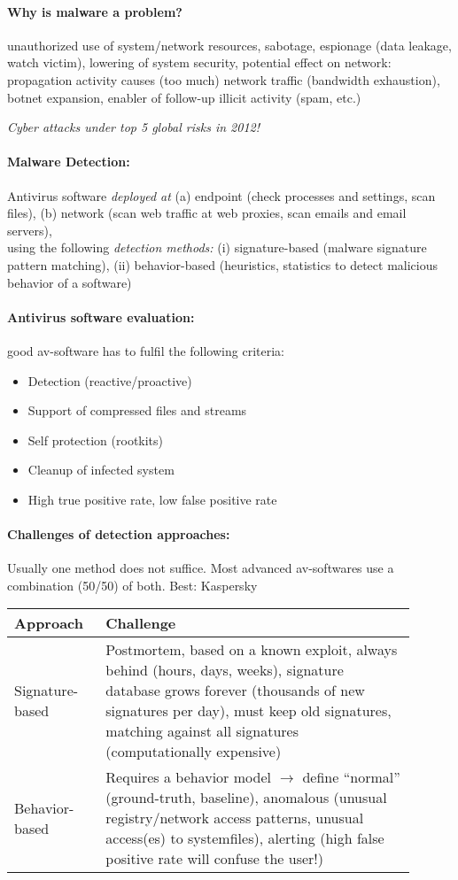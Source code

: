 \paragraph{Why is malware a problem?} unauthorized use of system/network resources,
sabotage, espionage (data leakage, watch victim),
lowering of system security, potential effect on
network: propagation activity causes (too much) network traffic (bandwidth exhaustion), botnet expansion, enabler of follow-up illicit activity (spam, etc.)

\emph{Cyber attacks under top 5 global risks in 2012!}

\paragraph{Malware Detection:} Antivirus software \emph{deployed at} (a) endpoint (check processes and settings, scan files), (b) network (scan web traffic at web proxies, scan emails and email servers), \\
using the following \emph{detection methods:} (i) signature-based (malware signature pattern matching), (ii) behavior-based (heuristics, statistics to detect malicious behavior of a software)

\paragraph{Antivirus software evaluation:} good av-software has to fulfil the following criteria:
\begin{itemize}
\item Detection (reactive/proactive)
\item Support of compressed files and streams
\item Self protection (rootkits)
\item Cleanup of infected system
\item High true positive rate, low false positive rate
\end{itemize}

\paragraph{Challenges of detection approaches:} Usually one method does not suffice. Most advanced av-softwares use a combination (50/50) of both. Best: Kaspersky

\begin{tabular}{p{0.2\linewidth}p{0.7\linewidth}}
Approach & Challenge \\
\hline
\hline
Signature-based & Postmortem, based on a known exploit, always behind (hours, days, weeks), signature database grows forever (thousands of new signatures per day), must keep old signatures, matching against all signatures (computationally expensive) \\
\hline
Behavior-based & Requires a behavior model $\to$ define ``normal'' (ground-truth, baseline), anomalous (unusual registry/network access patterns, unusual access(es) to systemfiles), alerting (high false positive rate will confuse the user!) \\
\end{tabular} 

